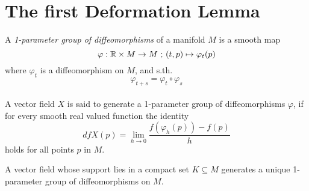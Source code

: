 \section{The first Deformation Lemma}

\begin{definition}
   \label{def:1-param group}
   A \textit{1-parameter group of diffeomorphisms} of a manifold $M$ is a 
   smooth map
   \[ \varphi: { \mathbb R } \times M \rightarrow M \text{ ; } (t, p) \mapsto \varphi_t(p) \]
   where $ \varphi_t $ is a diffeomorphism on $M$, and s.th. 
   \[ \varphi_{t+s} = \varphi_t \circ \varphi_s \] \\
   A vector field $X$ is said to generate a 1-parameter group of diffeomorphisms 
   $ \varphi $, if for every smooth real valued function the identity 
   \[ dfX(p) = \lim_{h \to 0} \frac{f(\varphi_h(p)) - f(p)}{h} \]
   holds for all points $p$ in $M$.
\end{definition}

\begin{lemma}
   \label{lemma:vector fields generate 1-parameter groups}
   A vector field whose support lies in a compact set $K \subseteq M$ generates 
   a unique 1-parameter group of diffeomorphisms on $M$.
\end{lemma}

